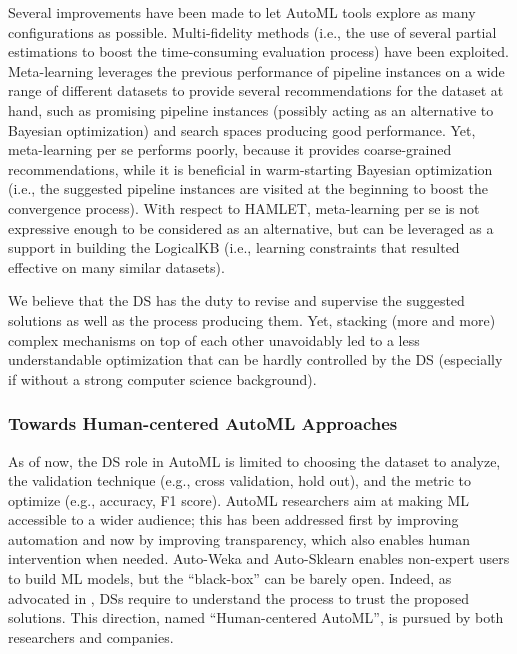 Several improvements have been made to let AutoML tools explore as many configurations as possible.
Multi-fidelity methods \cite{falkner2018bohb} (i.e., the use of several partial estimations to boost the time-consuming evaluation process) have been exploited. 
Meta-learning leverages the previous performance of pipeline instances on a wide range of different datasets to provide several recommendations for the dataset at hand, such as promising pipeline instances (possibly acting as an alternative to Bayesian optimization) and search spaces producing good performance.
Yet, meta-learning per se performs poorly, because it provides coarse-grained recommendations, while it is beneficial in warm-starting Bayesian optimization (i.e., the suggested pipeline instances are visited at the beginning to boost the convergence process).
With respect to HAMLET, meta-learning per se is not expressive enough to be considered as an alternative, but can be leveraged as a support in building the LogicalKB (i.e., learning constraints that resulted effective on many similar datasets).

We believe that the DS has the duty to revise and supervise the suggested solutions as well as the process producing them.
Yet, stacking (more and more) complex mechanisms on top of each other unavoidably led to a less understandable optimization that can be hardly controlled by the DS (especially if without a strong computer science background).

\subsubsection{Towards Human-centered AutoML Approaches}
As of now, the DS role in AutoML is limited to choosing the dataset to analyze, the validation technique (e.g., cross validation, hold out), and the metric to optimize (e.g., accuracy, F1 score).
AutoML researchers aim at making ML accessible to a wider audience;
this has been addressed first by improving automation and now by improving transparency, which also enables human intervention when needed.
Auto-Weka \cite{kotthoff2019auto} and Auto-Sklearn \cite{feurer2019auto} enables non-expert users to build ML models, but the ``black-box'' can be barely open.
Indeed, as advocated in \cite{drozdal2020trust}, DSs require to understand the process to trust the proposed solutions.
This direction, named ``Human-centered AutoML'', is pursued by both researchers and companies.

